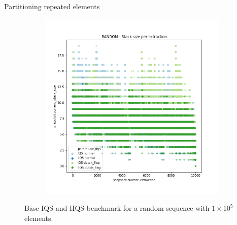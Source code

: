 \documentclass{beamer}
\begin{document}
\begin{frame}{Partitioning repeated elements}
\begin{figure}
\begin{subfigure}[b]{\textwidth}
            \includegraphics[height=0.4\textheight]{chapter4/02-basebenchmark-01-base-benchmark.png.2-0.png}
        \end{subfigure}
        \caption{Base IQS and IIQS benchmark for a random sequence with $1\times10^5$ elements.}
    \end{figure}


\end{frame}
\end{document}
